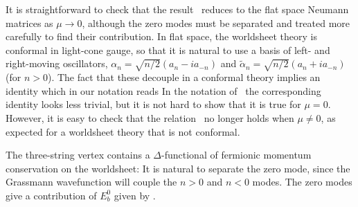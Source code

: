 It is straightforward to check that the result
\neuman\ reduces to the flat space Neumann matrices as $\mu \to 0$,
although the zero modes must be separated and treated more carefully
to find their contribution.  In flat space, the worldsheet theory
is conformal in light-cone gauge, so that it is natural
to use a basis of left- and right-moving oscillators,
${\alpha}_n = \sqrt{n/2}(a_n -i a_{-n})$
and $\tilde{\alpha}_n = \sqrt{n/2}(a_n + i a_{-n})$ (for $n>0$).
The fact that these decouple in a conformal theory implies
an identity which in our notation reads
\eqn{}
In the notation of \GSB\ the corresponding identity looks less trivial,
but it is not hard to show that it is true for $\mu=0$.
However, it is easy to check that the relation \decoupl\ no longer holds when
$\mu \ne 0$, as expected for a worldsheet theory that is
not conformal.




The three-string vertex contains a $\Delta$-functional of
fermionic momentum conservation on the worldsheet:
\eqn{}
It is natural to separate the zero mode, since the Grassmann
wavefunction will couple the $n>0$ and $n<0$ modes.
The zero modes give a contribution of $E_b^0$ given by
\ebdef.


